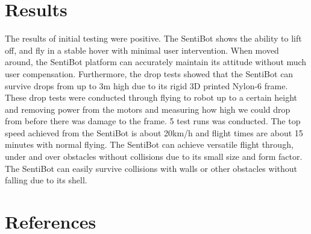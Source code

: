 \documentclass[12pt]{article}
\begin{document}
\section{Results}

The results of initial testing were positive. The SentiBot shows the ability to lift off, and fly in a stable hover with minimal user intervention. When moved around, the SentiBot platform can accurately maintain its attitude without much user compensation. Furthermore, the drop tests showed that the SentiBot can survive drops from up to 3m high due to its rigid 3D printed Nylon-6 frame. These drop tests were conducted through flying to robot up to a certain height and removing power from the motors and measuring how high we could drop from before there was damage to the frame. 5 test runs was conducted. The top speed achieved from the SentiBot is about 20km/h and flight times are about 15 minutes with normal flying. The SentiBot can achieve versatile flight through, under and over obstacles without collisions due to its small size and form factor. The SentiBot can easily survive collisions with walls or other obstacles without falling due to its shell. 

\section{References}



\end{document}
